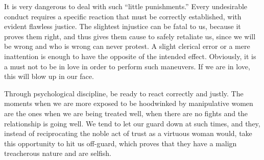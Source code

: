 \par It is very dangerous to deal with such \enquote{little punishments.} Every undesirable conduct requires a specific reaction that must be correctly established, with evident flawless justice. The slightest injustice can be fatal to us, because it proves them right, and thus gives them cause to safely retaliate us, since we will be wrong and who is wrong can never protest. A slight clerical error or a mere inattention is enough to have the opposite of the intended effect. Obviously, it is a must not to be in love in order to perform such maneuvers. If we are in love, this will blow up in our face.

\par Through psychological discipline, be ready to react correctly and justly. The moments when we are more exposed to be hoodwinked by manipulative women are the ones when we are being treated well, when there are no fights and the relationship is going well. We tend to let our guard down at such times, and they, instead of reciprocating the noble act of trust as a virtuous woman would, take this opportunity to hit us off-guard, which proves that they have a malign treacherous nature and are selfish.